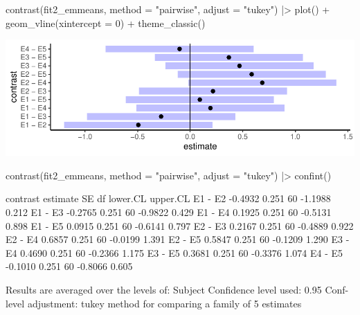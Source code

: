 \documentclass[a4paper]{article}
\begin{document}
\begin{Schunk}
\begin{Sinput}
contrast(fit2_emmeans, method = "pairwise", adjust = "tukey") |> 
  plot() + geom_vline(xintercept = 0) +
  theme_classic()
\end{Sinput}


{\centering \includegraphics[width=\maxwidth]{figure/listings-unnamed-chunk-295-1} 

}

\begin{Sinput}
contrast(fit2_emmeans, method = "pairwise", adjust = "tukey") |> confint()
\end{Sinput}
\begin{Soutput}
 contrast estimate    SE df lower.CL upper.CL
 E1 - E2   -0.4932 0.251 60  -1.1988    0.212
 E1 - E3   -0.2765 0.251 60  -0.9822    0.429
 E1 - E4    0.1925 0.251 60  -0.5131    0.898
 E1 - E5    0.0915 0.251 60  -0.6141    0.797
 E2 - E3    0.2167 0.251 60  -0.4889    0.922
 E2 - E4    0.6857 0.251 60  -0.0199    1.391
 E2 - E5    0.5847 0.251 60  -0.1209    1.290
 E3 - E4    0.4690 0.251 60  -0.2366    1.175
 E3 - E5    0.3681 0.251 60  -0.3376    1.074
 E4 - E5   -0.1010 0.251 60  -0.8066    0.605

Results are averaged over the levels of: Subject 
Confidence level used: 0.95 
Conf-level adjustment: tukey method for comparing a family of 5 estimates 
\end{Soutput}
\end{Schunk}
\end{document}
